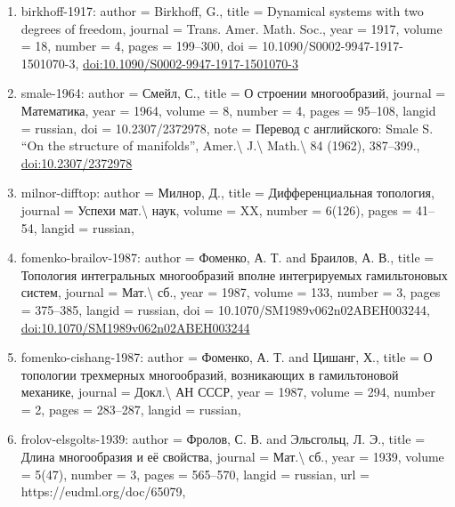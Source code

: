 \documentclass[11pt]{article}
\begin{document}
\begin{enumerate}[leftmargin=*]
  \item birkhoff-1917: author = Birkhoff, G., title = Dynamical systems with two degrees of freedom, journal = Trans. Amer. Math. Soc., year = 1917, volume = 18, number = 4, pages = 199--300, doi = 10.1090/S0002-9947-1917-1501070-3, \href{https://doi.org/10.1090/S0002-9947-1917-1501070-3}{doi:10.1090/S0002-9947-1917-1501070-3}
  \item smale-1964: author = Смейл, С., title = О строении многообразий, journal = Математика, year = 1964, volume = 8, number = 4, pages = 95--108, langid = russian, doi = 10.2307/2372978, note = Перевод с английского: Smale S. ``On the structure of manifolds'', Amer.\textbackslash{} J.\textbackslash{} Math.\textbackslash{} 84 (1962), 387--399., \href{https://doi.org/10.2307/2372978}{doi:10.2307/2372978}
  \item milnor-difftop: author = Милнор, Д., title = Дифференциальная топология, journal = Успехи мат.\textbackslash{} наук, volume = XX, number = 6(126), pages = 41--54, langid = russian,
  \item fomenko-brailov-1987: author = Фоменко, А. Т. and Браилов, А. В., title = Топология интегральных многообразий вполне интегрируемых гамильтоновых систем, journal = Мат.\textbackslash{} сб., year = 1987, volume = 133, number = 3, pages = 375--385, langid = russian, doi = 10.1070/SM1989v062n02ABEH003244, \href{https://doi.org/10.1070/SM1989v062n02ABEH003244}{doi:10.1070/SM1989v062n02ABEH003244}
  \item fomenko-cishang-1987: author = Фоменко, А. Т. and Цишанг, Х., title = О топологии трехмерных многообразий, возникающих в гамильтоновой механике, journal = Докл.\textbackslash{} АН СССР, year = 1987, volume = 294, number = 2, pages = 283--287, langid = russian,
  \item frolov-elsgolts-1939: author = Фролов, С. В. and Эльсгольц, Л. Э., title = Длина многообразия и её свойства, journal = Мат.\textbackslash{} сб., year = 1939, volume = 5(47), number = 3, pages = 565--570, langid = russian, url = https://eudml.org/doc/65079,
\end{enumerate}

% 
% 
\end{document}
